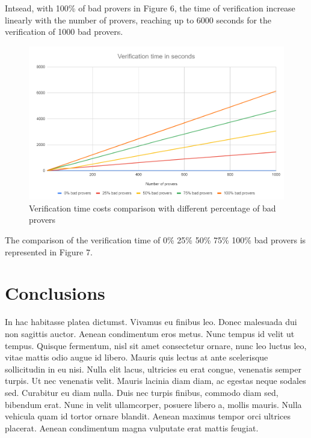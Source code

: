 \documentclass[10pt, a4paper, twocolumn]{article} %
\begin{document}
Intsead, with 100\% of bad provers in Figure 6, the time of verification increase linearly with the number of provers, reaching up to 6000 seconds for the verification of 1000 bad provers.\\
\begin{figure}
	\includegraphics[width=\linewidth]{images/verification_comparison.png} %
	\caption{Verification time costs comparison with different percentage of bad provers} %
	\label{bear} %
\end{figure}
The comparison of the verification time of 0\% 25\% 50\% 75\% 100\% bad provers is represented in Figure 7.\\
\section{Conclusions}

In hac habitasse platea dictumst. Vivamus eu finibus leo. Donec malesuada dui non sagittis auctor. Aenean condimentum eros metus. Nunc tempus id velit ut tempus. Quisque fermentum, nisl sit amet consectetur ornare, nunc leo luctus leo, vitae mattis odio augue id libero. Mauris quis lectus at ante scelerisque sollicitudin in eu nisi. Nulla elit lacus, ultricies eu erat congue, venenatis semper turpis. Ut nec venenatis velit. Mauris lacinia diam diam, ac egestas neque sodales sed. Curabitur eu diam nulla. Duis nec turpis finibus, commodo diam sed, bibendum erat. Nunc in velit ullamcorper, posuere libero a, mollis mauris. Nulla vehicula quam id tortor ornare blandit. Aenean maximus tempor orci ultrices placerat. Aenean condimentum magna vulputate erat mattis feugiat.


\printbibliography[title={Bibliography}] %

\end{document}
